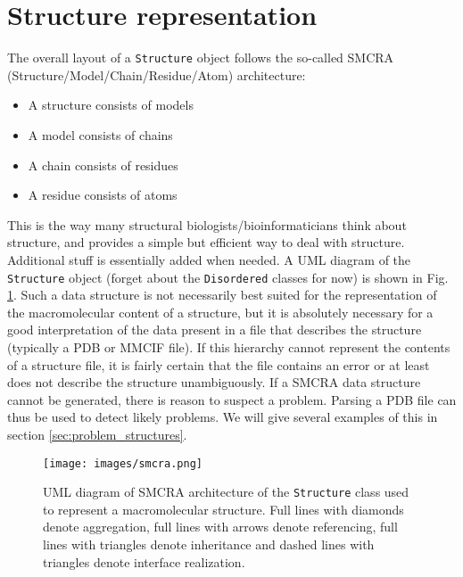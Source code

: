 \section{Structure representation}

The overall layout of a \texttt{Structure} object follows the so-called SMCRA
(Structure/Model/Chain/Residue/Atom) architecture:

\begin{itemize}
\item A structure consists of models
\item A model consists of chains
\item A chain consists of residues
\item A residue consists of atoms
\end{itemize}
This is the way many structural biologists/bioinformaticians think
about structure, and provides a simple but efficient way to deal with
structure. Additional stuff is essentially added when needed. A UML
diagram of the \texttt{Structure} object (forget about the \texttt{Disordered}
classes for now) is shown in Fig. \ref{fig:smcra}. Such a data structure is not
necessarily best suited for the representation of the macromolecular content of
a structure, but it is absolutely necessary for a good interpretation of the
data present in a file that describes the structure (typically a PDB or MMCIF
file). If this hierarchy cannot represent the contents of a structure file, it
is fairly certain that the file contains an error or at least does not describe
the structure unambiguously. If a SMCRA data structure cannot be generated,
there is reason to suspect a problem. Parsing a PDB file can thus be used to
detect likely problems. We will give several examples of this in section
\ref{sec:problem_structures}.

\begin{figure}[htbp]
\begin{htmlonly}
\end{htmlonly}
\begin{latexonly}
\centering
\texttt{[image: images/smcra.png]}
\end{latexonly}
\caption{UML diagram of SMCRA architecture of the \texttt{Structure} class used to represent a macromolecular structure.
Full lines with diamonds denote aggregation, full lines with
arrows denote referencing, full lines with triangles denote inheritance
and dashed lines with triangles denote interface realization.}
\label{fig:smcra}
\end{figure}

